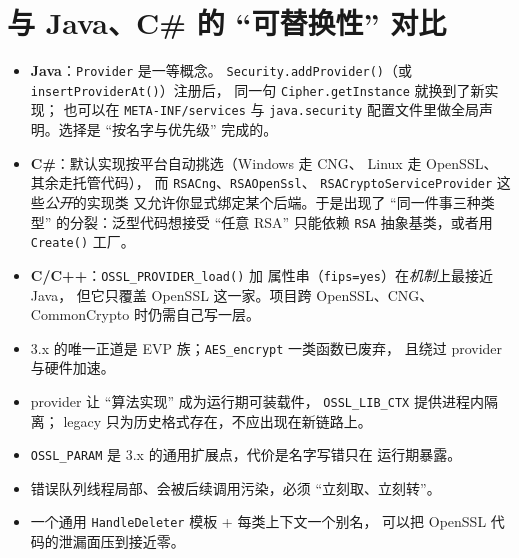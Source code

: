 \documentclass[12pt,a4paper,fontset=fandol]{ctexbook}
\newcommand{\Fn}[1]{\texttt{#1()}}
\newcommand{\Tp}[1]{\texttt{#1}}
\newcommand{\CSharp}{C\#}
\newcommand{\CppJava}{C/C++}
\begin{document}
\section{与 Java、\CSharp{} 的 ``可替换性'' 对比}

\begin{compare}[title=三语言 ``换一个实现'' 的改动面]
\begin{itemize}
  \item \textbf{Java}：\Tp{Provider} 是一等概念。
        \Fn{Security.add\allowbreak{}Provider}（或 \Fn{insert\allowbreak{}Provider\allowbreak{}At}）注册后，
        同一句 \Tp{Cipher.get\allowbreak{}Instance} 就换到了新实现；
        也可以在 \Tp{META-\allowbreak{}INF/\allowbreak{}\allowbreak{}services} 与 \Tp{java.security}
        配置文件里做全局声明。选择是 ``按名字与优先级'' 完成的。
  \item \textbf{\CSharp{}}：默认实现按平台自动挑选（Windows 走 CNG、
        Linux 走 OpenSSL、其余走托管代码），
        而 \Tp{RSACng}、\Tp{RSAOpenSsl}、
        \Tp{RSACryptoServiceProvider} 这些\emph{公开}的实现类
        又允许你显式绑定某个后端。于是出现了 ``同一件事三种类型''
        的分裂：泛型代码想接受 ``任意 RSA'' 只能依赖
        \Tp{RSA} 抽象基类，或者用 \Tp{Create()} 工厂。
  \item \textbf{\CppJava{}}：\Fn{OSSL\_PROVIDER\_load} 加
        属性串（\texttt{fips=yes}）在\emph{机制}上最接近 Java，
        但它只覆盖 OpenSSL 这一家。项目跨 OpenSSL、CNG、
        CommonCrypto 时仍需自己写一层。
\end{itemize}
\end{compare}

\begin{guideline}[title=本章要点]
\begin{itemize}
  \item 3.x 的唯一正道是 EVP 族；\Tp{AES\_encrypt} 一类函数已废弃，
        且绕过 provider 与硬件加速。
  \item provider 让 ``算法实现'' 成为运行期可装载件，
        \Tp{OSSL\_LIB\_CTX} 提供进程内隔离；
        legacy 只为历史格式存在，不应出现在新链路上。
  \item \Tp{OSSL\_PARAM} 是 3.x 的通用扩展点，代价是名字写错只在
        运行期暴露。
  \item 错误队列线程局部、会被后续调用污染，必须 ``立刻取、立刻转''。
  \item 一个通用 \Tp{HandleDeleter} 模板 + 每类上下文一个别名，
        可以把 OpenSSL 代码的泄漏面压到接近零。
\end{itemize}
\end{guideline}
\end{document}
